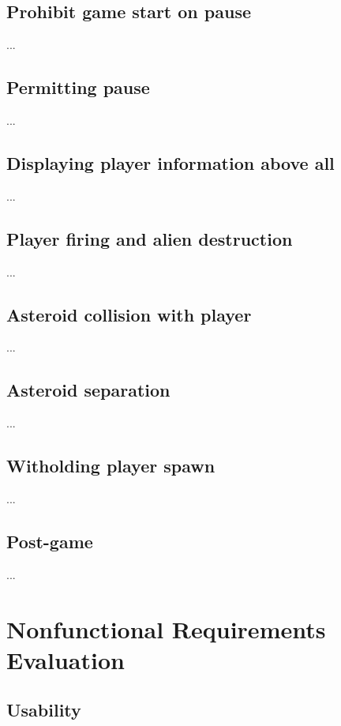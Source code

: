 \documentclass[12pt, titlepage]{article}
\begin{document}
\subsection{Prohibit game start on pause}
...\\
\subsection{Permitting pause}
...\\
\subsection{Displaying player information above all}
...\\
\subsection{Player firing and alien destruction}
...\\
\subsection{Asteroid collision with player}
...\\
\subsection{Asteroid separation}
...\\
\subsection{Witholding player spawn}
...\\
\subsection{Post-game}
...\\



\section{Nonfunctional Requirements Evaluation}

\subsection{Usability}
\end{document}
